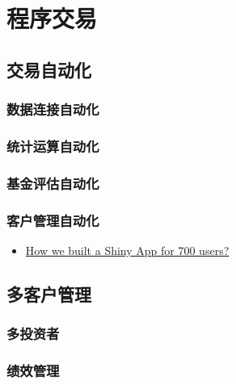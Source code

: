 \documentclass[]{book}
\providecommand{\tightlist}{%
  \setlength{\itemsep}{0pt}\setlength{\parskip}{0pt}}
\theoremstyle{definition}
\theoremstyle{definition}
\theoremstyle{definition}
\theoremstyle{remark}
\begin{document}
\chapter{程序交易}\label{algorithm}

\section{交易自动化}

\subsection{数据连接自动化}

\subsection{统计运算自动化}

\subsection{基金评估自动化}

\subsection{客户管理自动化}

\begin{itemize}
\tightlist
\item
  \href{https://appsilon.com/how-we-built-a-shiny-app-for-700-users/}{How
  we built a Shiny App for 700 users?}
\end{itemize}

\section{多客户管理}

\subsection{多投资者}

\subsection{绩效管理}

\section{}\label{section-4}
\end{document}
